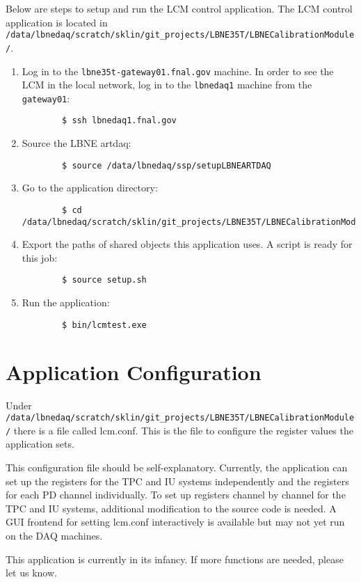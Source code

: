 \documentclass[12pt,a4paper,final]{iopart}
\begin{document}
Below are steps to setup and run the LCM control application. The LCM control application is located in \\
\verb|/data/lbnedaq/scratch/sklin/git_projects/LBNE35T/LBNECalibrationModule/|.

\begin{enumerate}
	\item Log in to the \texttt{lbne35t-gateway01.fnal.gov} machine. In order to see the LCM in the local network, log in to the \texttt{lbnedaq1} machine from the \texttt{gateway01}:
	\begin{verbatim}
		$ ssh lbnedaq1.fnal.gov
	\end{verbatim}
	\item Source the LBNE artdaq:
	\begin{verbatim}
		$ source /data/lbnedaq/ssp/setupLBNEARTDAQ
	\end{verbatim}
	\item Go to the application directory:
	\begin{verbatim}
		$ cd /data/lbnedaq/scratch/sklin/git_projects/LBNE35T/LBNECalibrationModule
	\end{verbatim}
	\item Export the paths of shared objects this application uses. A script is ready for this job:
	\begin{verbatim}
		$ source setup.sh
	\end{verbatim}
	\item Run the application:
	\begin{verbatim}
		$ bin/lcmtest.exe
	\end{verbatim}
\end{enumerate}

\section{Application Configuration}
Under \verb|/data/lbnedaq/scratch/sklin/git_projects/LBNE35T/LBNECalibrationModule/| there is a file called lcm.conf. This is the file to configure the register values the application sets.

This configuration file should be self-explanatory. Currently, the application can set up the registers for the TPC and IU systems independently and the registers for each PD channel individually. To set up registers channel by channel for the TPC and IU systems, additional modification to the source code is needed. A GUI frontend for setting lcm.conf interactively is available but may not yet run on the DAQ machines.

This application is currently in its infancy. If more functions are needed, please let us know.

%
%
\end{document}
